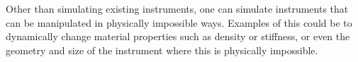 
Other than simulating existing instruments, one can simulate instruments that can be manipulated in physically impossible ways. %
Examples of this could be to dynamically change material properties such as density or stiffness, or even the geometry and size of the instrument where this is physically impossible. %



